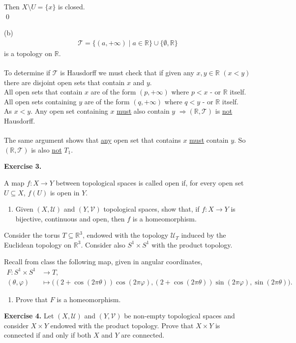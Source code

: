 \documentclass[12pt]{article}
\begin{document}
\noindent Then $X\setminus U=\{x\}$ is closed.\\
\qed

\newpage
\noindent
(b) 
\begin{align*}
\mathcal{T}=\{(a,+\infty)\mid a\in\mathbb{R}\}\cup\{\emptyset,\mathbb{R}\}
\end{align*}
is a topology on $\mathbb{R}$.\\
\\
To determine if $\mathcal{T}$ is Hausdorff we must check that if given any $x,y\in\mathbb{R}$ $(x<y)$ there are
disjoint open sets that contain $x$ and $y$.\\
All open sets that contain $x$ are of the form $(p,+\infty)$ where $p<x$ - or $\mathbb{R}$ itself.\\
All open sets containing $y$ are of the form $(q,+\infty)$ where $q<y$ - or $\mathbb{R}$ itself.\\
As $x<y$. Any open set containing $x$ \underline{must} also contain $y$
$\Rightarrow (\mathbb{R},\mathcal{T})$ is \underline{not} Hausdorff.\\
\\
The same argument shows that \underline{any} open set that contains $x$ \underline{must} contain $y$.
So $(\mathbb{R},\mathcal{T})$ is also \underline{not} $T_1$.

\newpage
\noindent\textbf{Exercise 3.}

\noindent A map $f:X\to Y$ between topological spaces is called open if, for every open set $U\subseteq X$, $f(U)$ is open in $Y$.
\begin{enumerate}
\item[(a)] Given $(X,\mathcal{U})$ and $(Y,\mathcal{V})$ topological spaces, show that, if $f:X\to Y$ is bijective, continuous and open, then $f$ is a homeomorphism.
\end{enumerate}
Consider the torus $T\subseteq\mathbb{R}^3$, endowed with the topology $\mathcal{U}_T$ induced by the Euclidean topology on $\mathbb{R}^3$. Consider also $S^1\times S^1$ with the product topology.

\noindent Recall from class the following map, given in angular coordinates,
\begin{align*}
F:S^1\times S^1&\longrightarrow T,\\
(\theta,\varphi)&\longmapsto
\bigl((2+\cos(2\pi\theta))\cos(2\pi\varphi),
(2+\cos(2\pi\theta))\sin(2\pi\varphi),
\sin(2\pi\theta)\bigr).
\end{align*}
\begin{enumerate}
\item[(b)] Prove that $F$ is a homeomorphism.
\end{enumerate}
\newpage
\noindent\textbf{Exercise 4.} Let $(X,\mathcal{U})$ and $(Y,\mathcal{V})$ be non-empty topological spaces and consider $X\times Y$ endowed with the product topology. Prove that $X\times Y$ is connected if and only if both $X$ and $Y$ are connected.
\end{document}
